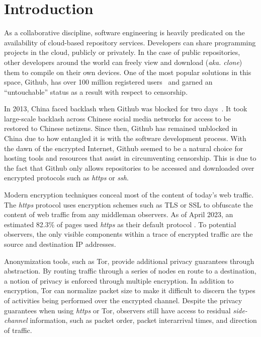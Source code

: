 \documentclass[sigconf,authorversion,nonacm]{acmart}
\begin{document}
\maketitle


\section{Introduction}

As a collaborative discipline, software engineering is heavily predicated on the availability of cloud-based repository services. Developers can share programming projects in the cloud, publicly or privately. In the case of public repositories, other developers around the world can freely view and download (\textit{aka. clone}) them to compile on their own devices. One of the most popular solutions in this space, Github, has over 100 million registered users~\cite{dohmke2023} and garned an ``untouchable'' status as a result with respect to censorship.

In 2013, China faced backlash when Github was blocked for two days~\cite{kan2013}. It took large-scale backlash across Chinese social media networks for access to be restored to Chinese netizens. Since then, Github has remained unblocked in China due to how entangled it is with the software development process. With the dawn of the encrypted Internet, Github seemed to be a natural choice for hosting tools and resources that assist in circumventing censorship. This is due to the fact that Github only allows repositories to be accessed and downloaded over encrypted protocols such as \textit{https} or \textit{ssh}.

Modern encryption techniques conceal most of the content of today's web traffic. The \textit{https} protocol uses encryption schemes such as TLS or SSL to obfuscate the content of web traffic from any middleman observers. As of April 2023, an estimated 82.3\% of pages used \textit{https} as their default protocol \cite{w3techs}. To potential observers, the only visible components within a trace of encrypted traffic are the source and destination IP addresses.

Anonymization tools, such as Tor\cite{dingledine2004tor}, provide additional privacy guarantees through abstraction. By routing traffic through a series of nodes en route to a destination, a notion of privacy is enforced through multiple encryption. In addition to encryption, Tor can normalize packet size to make it difficult to discern the types of activities being performed over the encrypted channel. Despite the privacy guarantees when using \textit{https} or Tor, observers still have access to residual \textit{side-channel} information, such as packet order, packet interarrival times, and direction of traffic.
\end{document}
